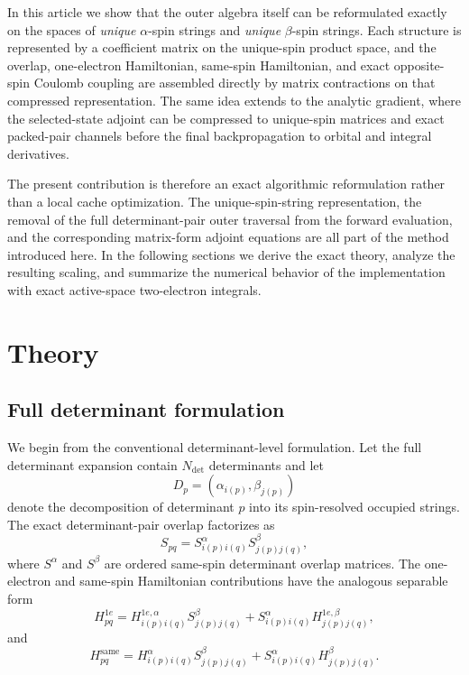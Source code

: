 \documentclass[journal=jctcce,manuscript=article]{achemso}
\newcommand{\ndet}{N_{\mathrm{det}}}
\begin{document}
In this article we show that the outer algebra itself can be reformulated
exactly on the spaces of \emph{unique} $\alpha$-spin strings and \emph{unique}
$\beta$-spin strings. Each structure is represented by a coefficient matrix on
the unique-spin product space, and the overlap, one-electron Hamiltonian,
same-spin Hamiltonian, and exact opposite-spin Coulomb coupling are assembled
directly by matrix contractions on that compressed representation. The same
idea extends to the analytic gradient, where the selected-state adjoint can be
compressed to unique-spin matrices and exact packed-pair channels before the
final backpropagation to orbital and integral derivatives.

The present contribution is therefore an exact algorithmic reformulation rather
than a local cache optimization. The unique-spin-string representation, the
removal of the full determinant-pair outer traversal from the forward
evaluation, and the corresponding matrix-form adjoint equations are all part
of the method introduced here. In the following sections we derive the exact
theory, analyze the resulting scaling, and summarize the numerical behavior of
the implementation with exact active-space two-electron integrals.

\section{Theory}

\subsection{Full determinant formulation}
We begin from the conventional determinant-level formulation. Let the full
determinant expansion contain $\ndet$ determinants and let
\begin{equation}
D_p = \left( \alpha_{i(p)}, \beta_{j(p)} \right)
\end{equation}
denote the decomposition of determinant $p$ into its spin-resolved occupied
strings. The exact determinant-pair overlap factorizes as
\begin{equation}
S_{pq} =
S^{\alpha}_{i(p)i(q)} S^{\beta}_{j(p)j(q)},
\label{eq:det-overlap-factor}
\end{equation}
where $S^{\alpha}$ and $S^{\beta}$ are ordered same-spin determinant overlap
matrices. The one-electron and same-spin Hamiltonian contributions have the
analogous separable form
\begin{equation}
H^{1e}_{pq} =
H^{1e,\alpha}_{i(p)i(q)} S^{\beta}_{j(p)j(q)}
+
S^{\alpha}_{i(p)i(q)} H^{1e,\beta}_{j(p)j(q)},
\label{eq:det-h1-factor}
\end{equation}
and
\begin{equation}
H^{\mathrm{same}}_{pq} =
H^{\alpha}_{i(p)i(q)} S^{\beta}_{j(p)j(q)}
+
S^{\alpha}_{i(p)i(q)} H^{\beta}_{j(p)j(q)}.
\label{eq:det-same-factor}
\end{equation}
\end{document}
